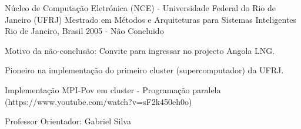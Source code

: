 


\begin{cventries}






\cventry
{Núcleo de Computação Eletrónica (NCE) - Universidade Federal do Rio de Janeiro (UFRJ)} %
{Mestrado em Métodos e Arquiteturas para Sistemas Inteligentes} %
{Rio de Janeiro, Brasil} %
{2005 - Não Concluido} %
{ %
\begin{cvitems}
\item {Motivo da não-conclusão: Convite para ingressar no projecto Angola LNG.}
\item {Pioneiro na implementação do primeiro cluster (supercomputador) da UFRJ.}
\item {Implementação MPI-Pov em cluster - Programação paralela (https://www.youtube.com/watch?v=sF2k450eh0o)}
\item {Professor Orientador: Gabriel Silva}
\end{cvitems}
}


\end{cventries}
